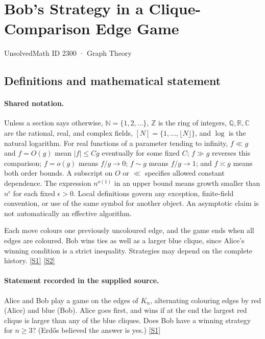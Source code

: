 \documentclass[11pt,a4paper]{article}
\newcommand{\N}{\mathbb{N}}
\newcommand{\Z}{\mathbb{Z}}
\newcommand{\Q}{\mathbb{Q}}
\newcommand{\R}{\mathbb{R}}
\newcommand{\C}{\mathbb{C}}
\newcommand{\sref}[2]{\hyperlink{source:#1:#2}{[S#2]}}
\begin{document}

\setcounter{section}{2299}

\section{Bob's Strategy in a Clique-Comparison Edge Game}\label{2300}

{\small\sffamily UnsolvedMath ID 2300 · Graph Theory}

\subsection{Definitions and mathematical statement}

\paragraph{Shared notation.}Unless a section says otherwise, $\N=\{1,2,\ldots\}$,
$\Z$ is the ring of integers, $\Q,\R,\C$ are the rational, real, and complex
fields, $[N]=\{1,\ldots,\lfloor N\rfloor\}$, and $\log$ is the natural
logarithm. For real functions of a parameter tending to infinity,
$f\ll g$ and $f=O(g)$ mean $|f|\leq Cg$ eventually for some fixed $C$;
$f\gg g$ reverses this comparison; $f=o(g)$ means $f/g\to0$;
$f\sim g$ means $f/g\to1$; and $f\asymp g$ means both order bounds.
A subscript on $O$ or $\ll$ specifies allowed constant dependence.
The expression $n^{o(1)}$ in an upper bound means growth smaller than
$n^\epsilon$ for each fixed $\epsilon>0$. Local definitions govern any
exception, finite-field convention, or use of the same symbol for another
object. An asymptotic claim is not automatically an effective algorithm.



Each move colours one previously uncoloured edge, and the game ends when all edges are coloured. Bob wins ties as well as a larger blue clique, since Alice's winning condition is a strict inequality. Strategies may depend on the complete history. \sref{2300}{1} \sref{2300}{2}

\paragraph{Statement recorded in the supplied source.}
Alice and Bob play a game on the edges of $K_n$, alternating colouring edges by red (Alice) and blue (Bob). Alice goes first, and wins if at the end the largest red clique is larger than any of the blue cliques.
Does Bob have a winning strategy for $n\geq 3$? (Erd\H{o}s believed the answer is yes.) \sref{2300}{1}
\end{document}
